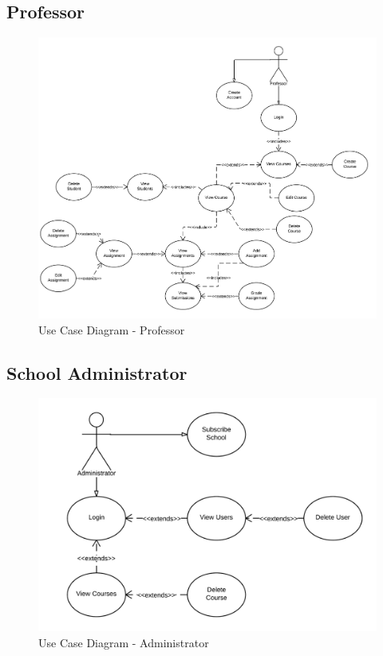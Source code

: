 \subsection*{Professor}
\begin{figure}[H]
	\centering
	\includegraphics[width=\textwidth]{img/useCaseProf}
	\caption{Use Case Diagram - Professor}
\end{figure}

\subsection*{School Administrator}

\begin{figure}[H]
	\centering
	\includegraphics[width=\textwidth]{img/useCaseAdmin}
	\caption{Use Case Diagram - Administrator}
\end{figure}

